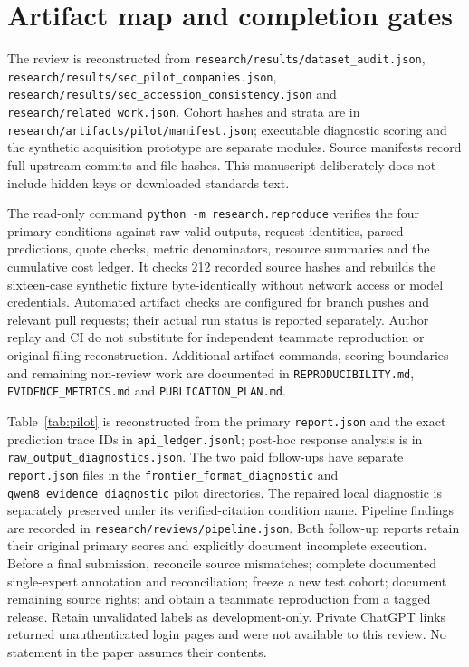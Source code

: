 \documentclass[11pt]{article}
\begin{document}
\appendix
\section{Artifact map and completion gates}
The review is reconstructed from \texttt{research/results/dataset\_audit.json}, \texttt{research/results/sec\_pilot\_companies.json}, \texttt{research/results/sec\_accession\_consistency.json} and \texttt{research/related\_work.json}. Cohort hashes and strata are in \texttt{research/artifacts/pilot/manifest.json}; executable diagnostic scoring and the synthetic acquisition prototype are separate modules. Source manifests record full upstream commits and file hashes. This manuscript deliberately does not include hidden keys or downloaded standards text.

The read-only command \texttt{python -m research.reproduce} verifies the four primary conditions against raw valid outputs, request identities, parsed predictions, quote checks, metric denominators, resource summaries and the cumulative cost ledger. It checks 212 recorded source hashes and rebuilds the sixteen-case synthetic fixture byte-identically without network access or model credentials. Automated artifact checks are configured for branch pushes and relevant pull requests; their actual run status is reported separately. Author replay and CI do not substitute for independent teammate reproduction or original-filing reconstruction. Additional artifact commands, scoring boundaries and remaining non-review work are documented in \texttt{REPRODUCIBILITY.md}, \texttt{EVIDENCE\_METRICS.md} and \texttt{PUBLICATION\_PLAN.md}.

Table~\ref{tab:pilot} is reconstructed from the primary \texttt{report.json} and the exact prediction trace IDs in \texttt{api\_ledger.jsonl}; post-hoc response analysis is in \texttt{raw\_output\_diagnostics.json}. The two paid follow-ups have separate \texttt{report.json} files in the \texttt{frontier\_format\_diagnostic} and \texttt{qwen8\_evidence\_diagnostic} pilot directories. The repaired local diagnostic is separately preserved under its verified-citation condition name. Pipeline findings are recorded in \texttt{research/reviews/pipeline.json}. Both follow-up reports retain their original primary scores and explicitly document incomplete execution. Before a final submission, reconcile source mismatches; complete documented single-expert annotation and reconciliation; freeze a new test cohort; document remaining source rights; and obtain a teammate reproduction from a tagged release. Retain unvalidated labels as development-only. Private ChatGPT links returned unauthenticated login pages and were not available to this review. No statement in the paper assumes their contents.
\end{document}
